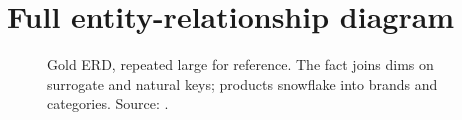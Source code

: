\chapter{Full entity-relationship diagram}

\begin{landscape}
\begin{figure}[tbp]
\centering

\caption{Gold ERD, repeated large for reference. The fact joins dims on surrogate and natural keys; products snowflake into brands and categories. Source: .}
\label{fig:erd-full}
\end{figure}
\end{landscape}
